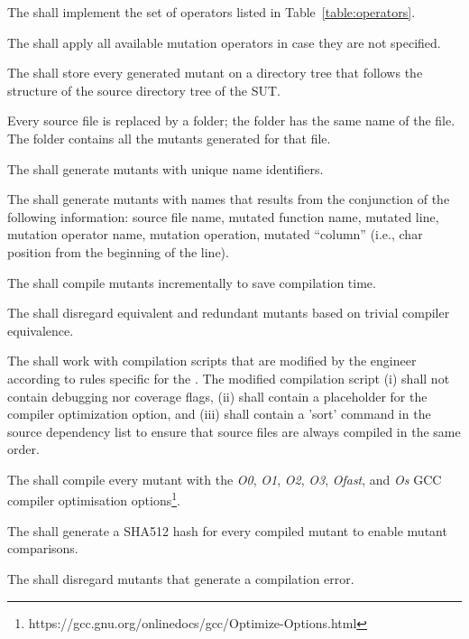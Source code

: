 \RQ{} The \FAQAS shall implement the set of operators listed in Table~\ref{table:operators}.



\RQ{} The \FAQAS shall apply all available mutation operators in case they are not specified.

\RQ{} The \FAQAS shall store every generated mutant on a directory tree that follows the structure of the source directory tree of the SUT.

\remark Every source file is replaced by a folder; the folder has the same name of the file. The folder contains all the mutants generated for that file.

\RQ{} The \FAQAS shall generate mutants with unique name identifiers.

\RQ{} The \FAQAS shall generate mutants with names that results from the conjunction of the following information:
source file name, mutated function name, mutated line, mutation operator name, mutation operation, mutated ``column'' (i.e., char position from the beginning of the line).

\RQ{} The \FAQAS shall compile mutants incrementally to save compilation time.

\RQ{} The \FAQAS shall disregard equivalent and redundant mutants based on trivial compiler equivalence.

\RQ{} The \FAQAS shall work with compilation scripts that are modified by the engineer according to rules specific for the \FAQAS.
The modified compilation script (i) shall not contain debugging nor coverage flags, (ii) shall contain a placeholder for the compiler optimization option, and (iii) shall contain a 'sort' command in the source dependency list to ensure that source files are always compiled in the same order.

\RQ{} The \FAQAS shall compile every mutant with the \textit{O0}, \textit{O1}, \textit{O2}, \textit{O3}, \textit{Ofast}, and \textit{Os} GCC compiler optimisation options\footnote{https://gcc.gnu.org/onlinedocs/gcc/Optimize-Options.html}.

\RQ{} The \FAQAS shall generate a SHA512 hash for every compiled mutant to enable mutant comparisons.

\RQ{} The \FAQAS shall disregard mutants that generate a compilation error.

